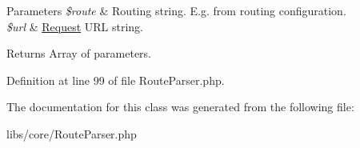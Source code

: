 \begin{DoxyParams}{\-Parameters}
{\em \$route} & \-Routing string. \-E.\-g. from routing configuration. \\
\hline
{\em \$url} & \hyperlink{class_request}{\-Request} \-U\-R\-L string. \\
\hline
\end{DoxyParams}
\begin{DoxyReturn}{\-Returns}
\-Array of parameters. 
\end{DoxyReturn}


\-Definition at line 99 of file \-Route\-Parser.\-php.



\-The documentation for this class was generated from the following file\-:\begin{DoxyCompactItemize}
\item 
libs/core/\-Route\-Parser.\-php\end{DoxyCompactItemize}
